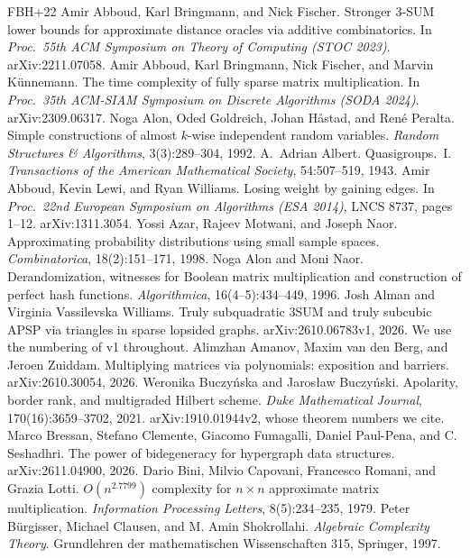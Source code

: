 \documentclass[11pt]{article}
\theoremstyle{definition}
\theoremstyle{remark}
\begin{document}
{\small
\begin{thebibliography}{FBH{+}22}\setlength{\itemsep}{0pt}
 Amir Abboud, Karl Bringmann, and Nick Fischer. Stronger 3-SUM lower bounds for approximate distance oracles via additive combinatorics. In \emph{Proc.\ 55th ACM Symposium on Theory of Computing (STOC 2023)}. arXiv:2211.07058.
 Amir Abboud, Karl Bringmann, Nick Fischer, and Marvin K\"unnemann. The time complexity of fully sparse matrix multiplication. In \emph{Proc.\ 35th ACM-SIAM Symposium on Discrete Algorithms (SODA 2024)}. arXiv:2309.06317.
 Noga Alon, Oded Goldreich, Johan H\aa stad, and Ren\'e Peralta. Simple constructions of almost $k$-wise independent random variables. \emph{Random Structures \& Algorithms}, 3(3):289--304, 1992.
 A.~Adrian Albert. Quasigroups.~I. \emph{Transactions of the American Mathematical Society}, 54:507--519, 1943.
 Amir Abboud, Kevin Lewi, and Ryan Williams. Losing weight by gaining edges. In \emph{Proc.\ 22nd European Symposium on Algorithms (ESA 2014)}, LNCS 8737, pages 1--12. arXiv:1311.3054.
 Yossi Azar, Rajeev Motwani, and Joseph Naor. Approximating probability distributions using small sample spaces. \emph{Combinatorica}, 18(2):151--171, 1998.
 Noga Alon and Moni Naor. Derandomization, witnesses for Boolean matrix multiplication and construction of perfect hash functions. \emph{Algorithmica}, 16(4--5):434--449, 1996.
 Josh Alman and Virginia Vassilevska Williams. Truly subquadratic 3SUM and truly subcubic APSP via triangles in sparse lopsided graphs. arXiv:2610.06783v1, 2026. We use the numbering of v1 throughout.
 Alimzhan Amanov, Maxim van den Berg, and Jeroen Zuiddam. Multiplying matrices via polynomials: exposition and barriers. arXiv:2610.30054, 2026.
 Weronika Buczyńska and Jarosław Buczyński. Apolarity, border rank, and multigraded Hilbert scheme. \emph{Duke Mathematical Journal}, 170(16):3659--3702, 2021. arXiv:1910.01944v2, whose theorem numbers we cite.
 Marco Bressan, Stefano Clemente, Giacomo Fumagalli, Daniel Paul-Pena, and C. Seshadhri. The power of bidegeneracy for hypergraph data structures. arXiv:2611.04900, 2026.
 Dario Bini, Milvio Capovani, Francesco Romani, and Grazia Lotti. $O(n^{2.7799})$ complexity for $n\times n$ approximate matrix multiplication. \emph{Information Processing Letters}, 8(5):234--235, 1979.
 Peter B\"urgisser, Michael Clausen, and M. Amin Shokrollahi. \emph{Algebraic Complexity Theory}. Grundlehren der mathematischen Wissenschaften 315, Springer, 1997.

\end{thebibliography}}
\end{document}
